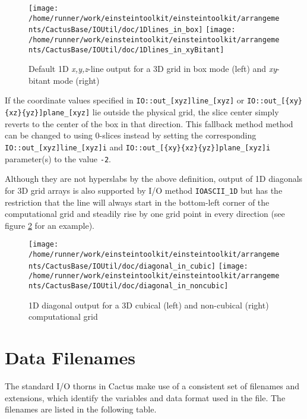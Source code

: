 \documentclass{article}
\begin{document}
\begin{figure}[ht]
\begin{center}
\texttt{[image: /home/runner/work/einsteintoolkit/einsteintoolkit/arrangements/CactusBase/IOUtil/doc/1Dlines\_in\_box]}
\texttt{[image: /home/runner/work/einsteintoolkit/einsteintoolkit/arrangements/CactusBase/IOUtil/doc/1Dlines\_in\_xyBitant]}
\end{center}
\caption{Default 1D {\it x,y,z}-line output for a 3D grid in box mode (left) and {\it xy}-bitant mode (right)}
\label{default_1D_output}
\end{figure}

If the coordinate values specified in {\tt IO::out\_[xyz]line\_[xyz]}
or {\tt IO::out\_[\{xy\}\{xz\}\{yz\}]plane\_[xyz]} lie outside the physical
grid, the slice center simply reverts to the center of the box in that
direction. This fallback method method can be changed to using 0-slices instead
by setting the corresponding {\tt IO::out\_[xyz]line\_[xyz]i}
and {\tt IO::out\_[\{xy\}\{xz\}\{yz\}]plane\_[xyz]i} parameter(s) to the value
{\tt -2}.

Although they are not hyperslabs by the above definition, output of 1D diagonals
for 3D grid arrays is also supported by I/O method {\tt IOASCII\_1D} but has the
restriction that the line will always start in the bottom-left corner of the
computational grid and steadily rise by one grid point in every direction (see
figure \ref{default_diagonal_output} for an example).

\begin{figure}[ht]
\begin{center}
\texttt{[image: /home/runner/work/einsteintoolkit/einsteintoolkit/arrangements/CactusBase/IOUtil/doc/diagonal\_in\_cubic]}
\texttt{[image: /home/runner/work/einsteintoolkit/einsteintoolkit/arrangements/CactusBase/IOUtil/doc/diagonal\_in\_noncubic]}
\end{center}
\caption{1D diagonal output for a 3D cubical (left) and non-cubical (right)
computational grid}
\label{default_diagonal_output}
\end{figure}


\section{Data Filenames}

The standard I/O thorns in Cactus make use of a consistent set of filenames
and extensions, which identify the variables and data format used in the file.
The filenames are listed in the following table.
\end{document}
